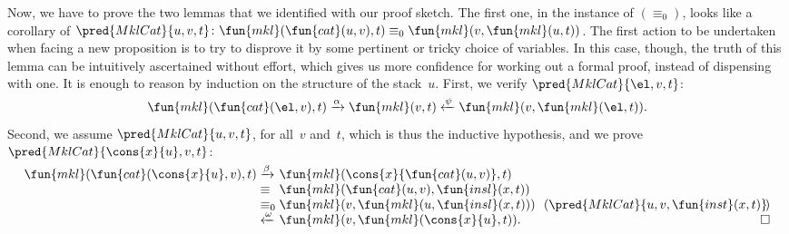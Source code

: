 Now, we have to prove the two lemmas that we identified with our proof
sketch. The first one, in the instance of \((\equiv_0)\), looks like a
corollary of \(\pred{MklCat}{u,v,t}
\colon \fun{mkl}(\fun{cat}(u,v),t) \equiv_0
\fun{mkl}(v,\fun{mkl}(u,t))\). The first action to be undertaken when
facing a new proposition is to try to disprove it by some pertinent or
tricky choice of variables. In this case, though, the truth of this
lemma can be intuitively ascertained without effort, which gives us
more confidence for working out a formal proof, instead of dispensing
with one. It is enough to reason by induction on the structure of the
stack~\(u\). First, we verify \(\pred{MklCat}{\el,v,t}\):
\begin{equation*}
\fun{mkl}(\fun{cat}(\el,v),t)
  \xrightarrow{\smash{\alpha}} \fun{mkl}(v,t)
  \xleftarrow{\smash{\psi}} \fun{mkl}(v,\fun{mkl}(\el,t)).
\end{equation*}
Second, we assume \(\pred{MklCat}{u,v,t}\), for all~\(v\) and~\(t\),
which is thus the inductive hypothesis, and we prove
\(\pred{MklCat}{\cons{x}{u},v,t}\):
\begin{equation*}
  \begin{array}{@{}r@{\;}l@{\;}l@{\quad}r@{}}
      \fun{mkl}(\fun{cat}(\cons{x}{u},v),t)
& \xrightarrow{\smash{\beta}} &
  \fun{mkl}(\cons{x}{\fun{cat}(u,v)},t)\\
& \equiv &
  \fun{mkl}(\fun{cat}(u,v),\fun{insl}(x,t))\\
& \equiv_0 & \fun{mkl}(v,\fun{mkl}(u,\fun{insl}(x,t)))
         & \!\!(\pred{MklCat}{u,v,\fun{inst}(x,t)}\!)\\
& \xleftarrow{\smash{\omega}} &
  \fun{mkl}(v,\fun{mkl}(\cons{x}{u},t)). & \hfill\Box
\end{array}
\end{equation*}


